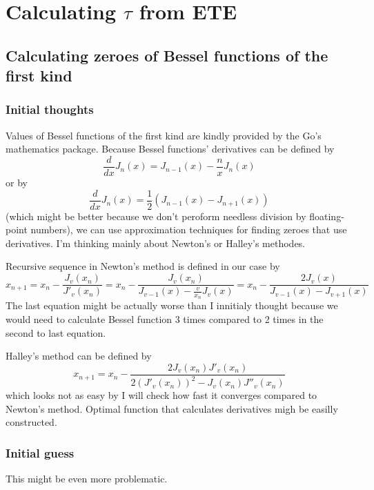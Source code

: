 \documentclass[a4paper]{article}
\begin{document}
	\section{Calculating $\tau$ from ETE}
	\subsection{Calculating zeroes of Bessel functions of the first kind}
	\subsubsection{Initial thoughts}
	Values of Bessel functions of the first kind are
	kindly provided by the Go's mathematics package.
	Because Bessel functions' derivatives can be defined by 
	\begin{equation*}
		\frac{d}{dx}J_n(x) = J_{n-1}(x) - \frac{n}{x}J_n(x)
	\end{equation*}
	or by
	\begin{equation*}
		\frac{d}{dx}J_n(x) = \frac{1}{2}(J_{n-1}(x) - J_{n+1}(x))
	\end{equation*}
	(which might be better because we don't peroform needless division by floating-point numbers),
	we can use approximation techniques for finding zeroes that use derivatives.
	I'm thinking mainly about Newton's or Halley's methodes.

	Recursive sequence in Newton's method is defined in our case by
	\begin{equation*}
		x_{n+1} = x_n - \frac{J_v(x_n)}{J'_v(x_n)} = 
			x_n - \frac{J_v(x_n)}{J_{v-1}(x) - \frac{v}{x_n}J_v(x)} =
			x_n - \frac{2J_v(x)}{J_{v-1}(x) - J_{v+1}(x)}
	\end{equation*}
	The last equation might be actually worse than I innitialy thought
	because we would need to calculate Bessel function 3 times compared to 2 times
	in the second to last equation.

	Halley's method can be defined by
	\begin{equation*}
		x_{n+1} = x_n - \frac{2J_v(x_n)J'_v(x_n)}{2(J'_v(x_n))^2 - J_v(x_n)J''_v(x_n)}
	\end{equation*}
	which looks not as easy by I will check how fast it converges compared to
	Newton's method. Optimal function that calculates derivatives migh be easilly constructed.
	\subsubsection{Initial guess}
	This might be even more problematic.
	
\end{document}
